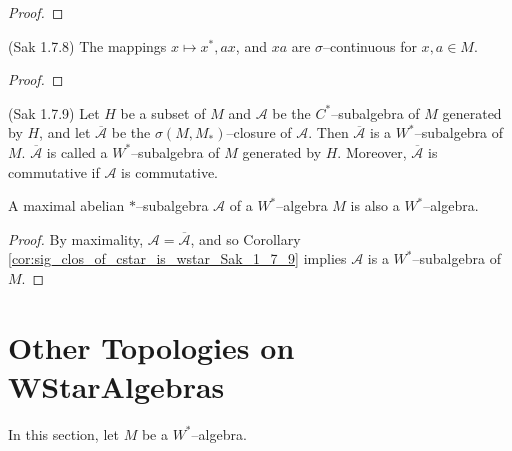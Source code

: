 \begin{proof}
\end{proof}

\begin{lemma}
  \label{lem:star_left_mul_right_mul_sig_cts_Sak_1_7_8} (Sak 1.7.8)
  The mappings $x\mapsto x^{*},ax$, and $xa$ are $\sigma$--continuous for
  $x,a \in M$.
\end{lemma}

\begin{proof}
\end{proof}

\begin{corollary}
  \label{cor:sig_clos_of_cstar_is_wstar_Sak_1_7_9} (Sak 1.7.9)
  Let $H$ be a subset of $M$ and $\mathcal{A}$ be the $C^{*}$--subalgebra of $M$ generated
  by $H$, and let $\overline{\mathcal{A}}$ be the $\sigma(M,M_{*})$--closure of $\mathcal{A}$. Then
  $\overline{\mathcal{A}}$ is a $W^{*}$--subalgebra of $M$. $\overline{\mathcal{A}}$ is called a $W^{*}$--subalgebra
  of $M$ generated by $H$. Moreover, $\overline{\mathcal{A}}$ is commutative if $\mathcal{A}$ is commutative.
\end{corollary}

\begin{lemma}
  \label{lem:wstar_of_masa}
  A maximal abelian $*$--subalgebra $\mathcal{A}$ of a $W^{*}$--algebra $M$ is also a $W^{*}$--algebra.
\end{lemma}

\begin{proof}
    By maximality, $\mathcal{A} =\overline{\mathcal{A}}$, and so Corollary \ref{cor:sig_clos_of_cstar_is_wstar_Sak_1_7_9}
    implies $\mathcal{A}$ is a $W^{*}$--subalgebra of $M$.
\end{proof}

\section{Other Topologies on WStarAlgebras}

In this section, let $M$ be a $W^{*}$--algebra.


